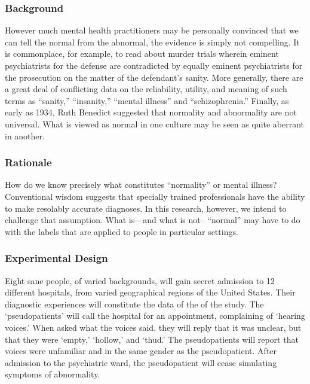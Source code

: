 \begin{refsection}
\subsubsection{Background}
\label{background}

However much mental health practitioners may be personally convinced that we can tell the normal from the abnormal, the evidence is simply not compelling. It is commonplace, for example, to read about murder trials wherein eminent psychiatrists for the defense are contradicted by equally eminent psychiatrists for the prosecution on the matter of the defendant's sanity. More generally, there are a great deal of conflicting data on the reliability, utility, and meaning of such terms as “sanity,” “insanity,” “mental illness” and “schizophrenia.” Finally, as early as 1934, Ruth Benedict suggested that normality and abnormality are not universal. What is viewed as normal in one culture may be seen as quite aberrant in another.

\subsubsection{Rationale}
\label{rationale}

How do we know precisely what constitutes “normality” or mental illness? Conventional wisdom suggests that specially trained professionals have the ability to make resolably accurate diagnoses. In this research, however, we intend to challenge that assumption. What is—and what is not-- “normal” may have to do with the labels that are applied to people in particular settings.

\subsubsection{Experimental Design}
\label{experimentaldesign}

Eight sane people, of varied backgrounds, will gain secret admission to 12 different hospitals, from varied geographical regions of the United States. Their diagnostic experiences will constitute the data of the of the study. The `pseudopatients' will call the hospital for an appointment, complaining of `hearing voices.' When asked what the voices said, they will reply that it was unclear, but that they were `empty,' `hollow,' and `thud.' The pseudopatients will report that voices were unfamiliar and in the same gender as the pseudopatient. After admission to the psychiatric ward, the pseudopatient will cease simulating symptoms of abnormality. 


\end{refsection}
